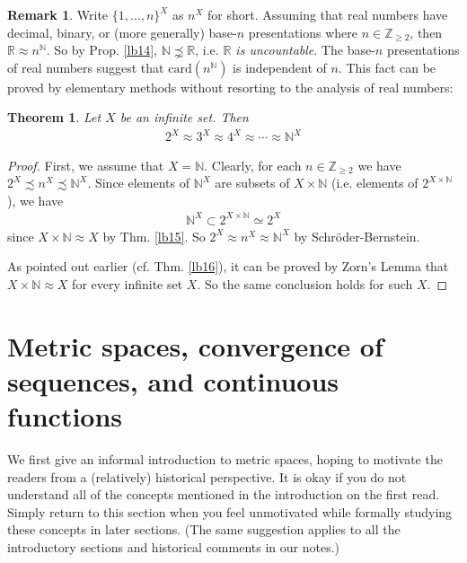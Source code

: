\documentclass[12pt,b5paper,notitlepage]{article}
\theoremstyle{definition}
\newtheorem{rem}[df]{Remark}
\theoremstyle{plain}
\newtheorem{thm}[df]{Theorem}
\newcommand{\Nbb}{\mathbb N}
\newcommand{\Zbb}{\mathbb Z}
\newcommand{\Rbb}{\mathbb R}
\newcommand{\card}{\mathrm{card}}
\numberwithin{equation}{section}
\begin{document}
\begin{rem}
Write $\{1,\dots,n\}^X$ as $n^X$ for short.  Assuming that real numbers have decimal, binary, or (more generally) base-$n$ presentations where $n\in\Zbb_{\geq 2}$, then  $\Rbb\approx n^{\Nbb}$. So by Prop. \ref{lb14}, $\Nbb\precnsim\Rbb$, i.e. \emph{$\Rbb$ is uncountable}. The base-$n$ presentations of real numbers suggest that $\card(n^\Nbb)$ is independent of $n$. This fact can be proved by elementary methods without  resorting to the analysis of real numbers:
\end{rem}

\begin{thm}
Let $X$ be an infinite set. Then
\begin{align*}
2^X\approx 3^X\approx 4^X\approx\cdots\approx \Nbb^X
\end{align*}
\end{thm}

\begin{proof}
First, we assume that $X=\Nbb$. Clearly, for each $n\in\Zbb_{\geq 2}$ we have $2^X\precsim n^X\precsim \Nbb^X$. Since elements of $\Nbb^X$ are subsets of $X\times\Nbb$ (i.e. elements of $2^{X\times\Nbb}$), we have
\begin{align*}
\Nbb^X\subset 2^{X\times\Nbb}\simeq 2^X
\end{align*}
since $X\times\Nbb\approx X$ by Thm. \ref{lb15}. So $2^X\approx n^X\approx \Nbb^X$ by Schr\"oder-Bernstein.

As pointed out earlier (cf. Thm. \ref{lb16}), it can be proved by Zorn's Lemma that $X\times\Nbb\approx X$ for every infinite set $X$. So the same conclusion holds for such $X$.
\end{proof}

\newpage

\section{Metric spaces, convergence of sequences, and continuous functions}


We first give an informal introduction to metric spaces, hoping to motivate the readers from a (relatively) historical perspective. It is okay if you do not understand all of the concepts mentioned in the introduction on the first read. Simply return to this section when you feel unmotivated while formally studying these concepts in later sections. (The same suggestion applies to all the introductory sections and historical comments in our notes.)
\end{document}
